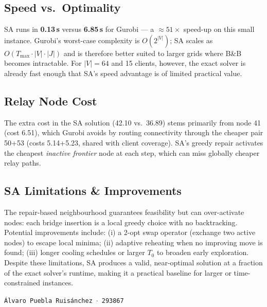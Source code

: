 \documentclass[10pt,a4paper,twocolumn]{article}
\begin{document}
\subsection{Speed vs.\ Optimality}

SA runs in \textbf{0.13\,s} versus \textbf{6.85\,s} for Gurobi — a
${\approx}51\times$ speed-up on this small instance.  Gurobi's
worst-case complexity is $O(2^{|V|})$; SA scales as
$O(T_{\max}\!\cdot\!|V|\!\cdot\!|J|)$ and is therefore better suited
to larger grids where B\&B becomes intractable. For $|V|=64$ and 15
clients, however, the exact solver is already fast enough that SA's
speed advantage is of limited practical value.

\subsection{Relay Node Cost}

The extra cost in the SA solution (42.10 vs.\ 36.89) stems primarily
from node 41 (cost 6.51), which Gurobi avoids by routing connectivity
through the cheaper pair 50+53 (costs 5.14+5.23, shared with client
coverage). SA's greedy repair activates the cheapest \emph{inactive
frontier} node at each step, which can miss globally cheaper relay
paths.

\subsection{SA Limitations \& Improvements}

The repair-based neighbourhood guarantees feasibility but can
over-activate nodes: each bridge insertion is a local greedy choice
with no backtracking. Potential improvements include: (i) a 2-opt swap
operator (exchange two active nodes) to escape local minima; (ii)
adaptive reheating when no improving move is found; (iii) longer
cooling schedules or larger $T_0$ to broaden early exploration.  Despite
these limitations, SA produces a valid, near-optimal solution at a
fraction of the exact solver's runtime, making it a practical baseline
for larger or time-constrained instances.

\vfill
\begin{center}
\fontsize{7pt}{9pt}\selectfont\color{gray}
\texttt{Álvaro Puebla Ruisánchez}\ $\cdot$\
\texttt{293867}
\end{center}
\end{document}
